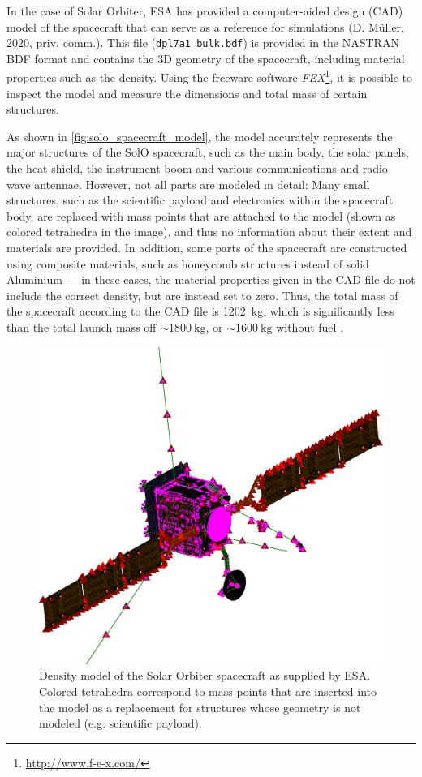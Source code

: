 In the case of Solar Orbiter, ESA has provided a computer-aided design (CAD) model of the spacecraft that can serve as a reference for simulations (D. Müller, 2020, priv. comm.). This file (\texttt{dpl7a1\_bulk.bdf}) is provided in the NASTRAN BDF format
and contains the 3D geometry of the spacecraft, including material properties such as the density. Using the freeware software \textit{FEX}\footnote{\url{http://www.f-e-x.com/}}, it is possible to inspect the model and measure the dimensions and total mass of certain structures.

As shown in \autoref{fig:solo_spacecraft_model}, the model accurately represents the major structures of the SolO spacecraft, such as the main body, the solar panels, the heat shield, the instrument boom and various communications and radio wave antennae. However, not all parts are modeled in detail: Many small structures, such as the scientific payload and electronics within the spacecraft body, are replaced with mass points that are attached to the model (shown as colored tetrahedra in the image), and thus no information about their extent and materials are provided. In addition, some parts of the spacecraft are constructed using composite materials, such as honeycomb structures instead of solid Aluminium --- in these cases, the material properties given in the CAD file do not include the correct density, but are instead set to zero. Thus, the total mass of the spacecraft according to the CAD file is \SI{1202}{\kilogram}, which is significantly less than the total launch mass off $\sim\SI{1800}{\kilo\gram}$, or $\sim\SI{1600}{\kilo\gram}$ without fuel \citep{Mueller-2020-SolO}.

\begin{figure}
	\centering
	\includegraphics[width=0.7\linewidth]{images/solo_spacecraft_model}
	\caption[Density model of the Solar Orbiter spacecraft]{Density model of the Solar Orbiter spacecraft as supplied by ESA. Colored tetrahedra correspond to mass points that are inserted into the model as a replacement for structures whose geometry is not modeled (e.g. scientific payload).}
	\label{fig:solo_spacecraft_model}
\end{figure}

